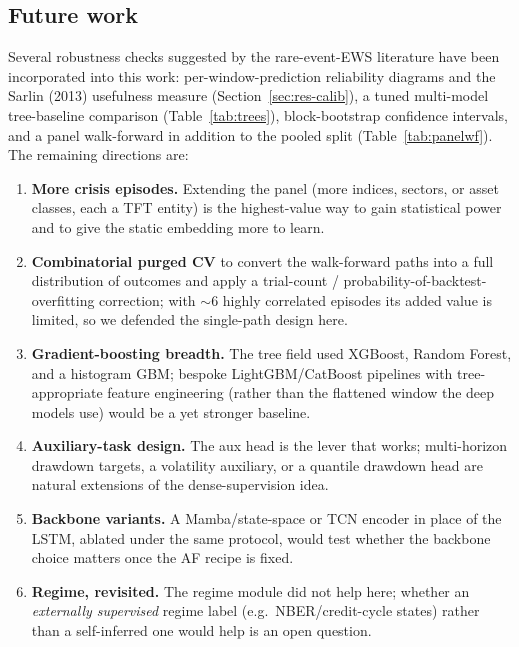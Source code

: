 \documentclass[11pt,a4paper]{article}
\begin{document}
\subsection{Future work}
\label{sec:future}
Several robustness checks suggested by the rare-event-EWS literature have been
incorporated into this work: per-window-prediction reliability diagrams and the
Sarlin (2013) usefulness measure (Section~\ref{sec:res-calib}), a tuned
multi-model tree-baseline comparison (Table~\ref{tab:trees}), block-bootstrap
confidence intervals, and a panel walk-forward in addition to the pooled split
(Table~\ref{tab:panelwf}). The remaining directions are:
\begin{enumerate}
\item \textbf{More crisis episodes.} Extending the panel (more indices,
sectors, or asset classes, each a TFT entity) is the highest-value way to gain
statistical power and to give the static embedding more to learn.
\item \textbf{Combinatorial purged CV} to convert the walk-forward paths into a
full distribution of outcomes and apply a trial-count /
probability-of-backtest-overfitting correction; with $\sim$6 highly correlated
episodes its added value is limited, so we defended the single-path design here.
\item \textbf{Gradient-boosting breadth.} The tree field used XGBoost, Random
Forest, and a histogram GBM; bespoke LightGBM/CatBoost pipelines with
tree-appropriate feature engineering (rather than the flattened window the deep
models use) would be a yet stronger baseline.
\item \textbf{Auxiliary-task design.} The aux head is the lever that works;
multi-horizon drawdown targets, a volatility auxiliary, or a quantile drawdown
head are natural extensions of the dense-supervision idea.
\item \textbf{Backbone variants.} A Mamba/state-space or TCN encoder in place
of the LSTM, ablated under the same protocol, would test whether the backbone
choice matters once the AF recipe is fixed.
\item \textbf{Regime, revisited.} The regime module did not help here; whether
an \emph{externally supervised} regime label (e.g.\ NBER/credit-cycle states)
rather than a self-inferred one would help is an open question.
\end{enumerate}

\appendix
\end{document}
